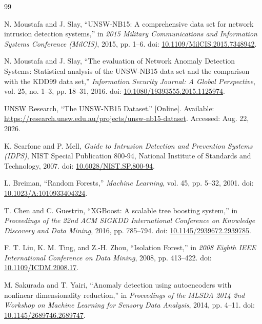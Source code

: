 \documentclass[12pt,a4paper,oneside]{report}
\begin{document}
\clearpage
\sloppy
\begin{thebibliography}{99}

N. Moustafa and J. Slay, ``UNSW-NB15: A comprehensive data set for network intrusion detection systems,'' in \textit{2015 Military Communications and Information Systems Conference (MilCIS)}, 2015, pp. 1--6. doi: \href{https://doi.org/10.1109/MilCIS.2015.7348942}{10.1109/MilCIS.2015.7348942}.

N. Moustafa and J. Slay, ``The evaluation of Network Anomaly Detection Systems: Statistical analysis of the UNSW-NB15 data set and the comparison with the KDD99 data set,'' \textit{Information Security Journal: A Global Perspective}, vol. 25, no. 1--3, pp. 18--31, 2016. doi: \href{https://doi.org/10.1080/19393555.2015.1125974}{10.1080/19393555.2015.1125974}.

UNSW Research, ``The UNSW-NB15 Dataset.'' [Online]. Available: \url{https://research.unsw.edu.au/projects/unsw-nb15-dataset}. Accessed: Aug. 22, 2026.

K. Scarfone and P. Mell, \textit{Guide to Intrusion Detection and Prevention Systems (IDPS)}, NIST Special Publication 800-94, National Institute of Standards and Technology, 2007. doi: \href{https://doi.org/10.6028/NIST.SP.800-94}{10.6028/NIST.SP.800-94}.

L. Breiman, ``Random Forests,'' \textit{Machine Learning}, vol. 45, pp. 5--32, 2001. doi: \url{10.1023/A:1010933404324}.

T. Chen and C. Guestrin, ``XGBoost: A scalable tree boosting system,'' in \textit{Proceedings of the 22nd ACM SIGKDD International Conference on Knowledge Discovery and Data Mining}, 2016, pp. 785--794. doi: \href{https://doi.org/10.1145/2939672.2939785}{10.1145/2939672.2939785}.

F. T. Liu, K. M. Ting, and Z.-H. Zhou, ``Isolation Forest,'' in \textit{2008 Eighth IEEE International Conference on Data Mining}, 2008, pp. 413--422. doi: \href{https://doi.org/10.1109/ICDM.2008.17}{10.1109/ICDM.2008.17}.

M. Sakurada and T. Yairi, ``Anomaly detection using autoencoders with nonlinear dimensionality reduction,'' in \textit{Proceedings of the MLSDA 2014 2nd Workshop on Machine Learning for Sensory Data Analysis}, 2014, pp. 4--11. doi: \href{https://doi.org/10.1145/2689746.2689747}{10.1145/2689746.2689747}.


\end{thebibliography}
\end{document}
